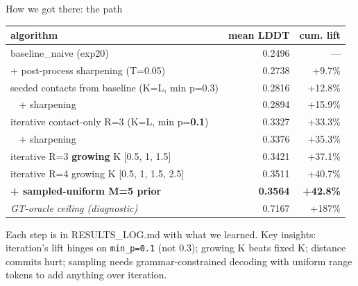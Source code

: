 \documentclass[aspectratio=169,11pt]{beamer}
\newcommand{\code}[1]{\texttt{\small\color{navy}#1}}
\begin{document}
\begin{frame}{How we got there: the path}
  \begin{center}\small
    \begin{tabular}{lrr}
      \toprule
      algorithm & mean LDDT & cum. lift\\
      \midrule
      baseline\_naive (exp20) & 0.2496 & --- \\
      + post-process sharpening (T=0.05) & 0.2738 & +9.7\% \\
      seeded contacts from baseline (K=L, min p=0.3) & 0.2816 & +12.8\% \\
      $\;\;$ + sharpening & 0.2894 & +15.9\% \\
      iterative contact-only R=3 (K=L, min p=\textbf{0.1}) & 0.3327 & +33.3\% \\
      $\;\;$ + sharpening & 0.3376 & +35.3\% \\
      iterative R=3 \textbf{growing} K [0.5, 1, 1.5] & 0.3421 & +37.1\% \\
      iterative R=4 growing K [0.5, 1, 1.5, 2.5] & 0.3511 & +40.7\% \\
      \textbf{+ sampled-uniform M=5 prior} & \textbf{0.3564} & \textbf{+42.8\%} \\
      \midrule
      \textit{GT-oracle ceiling (diagnostic)} & 0.7167 & +187\% \\
      \bottomrule
    \end{tabular}
  \end{center}
  \vspace{0.6em}
  Each step is in RESULTS\_LOG.md with what we learned. Key insights:
  iteration's lift hinges on \code{min\_p=0.1} (not 0.3); growing K
  beats fixed K; distance commits hurt; sampling needs grammar-constrained
  decoding with uniform range tokens to add anything over iteration.
\end{frame}
\end{document}
